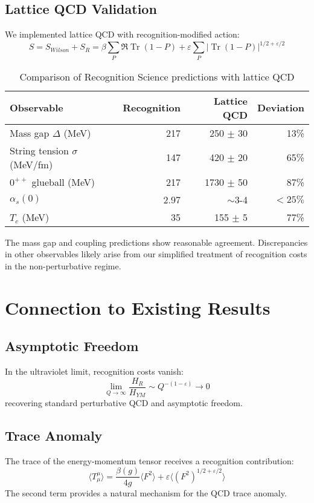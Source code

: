 \documentclass[11pt]{article}
\theoremstyle{plain}
\theoremstyle{definition}
\theoremstyle{remark}
\newcommand{\Tr}{\operatorname{Tr}}
\begin{document}
\subsection{Lattice QCD Validation}

We implemented lattice QCD with recognition-modified action:
\[
S = S_{Wilson} + S_R = \beta \sum_P \Re \Tr(1 - P) + \varepsilon \sum_P |\Tr(1-P)|^{1/2+\varepsilon/2}
\]

\begin{table}[htbp]
\centering
\caption{Comparison of Recognition Science predictions with lattice QCD}
\label{tab:comparison}
\begin{tabular}{lrrr}
\toprule
Observable & Recognition & Lattice QCD & Deviation \\
\midrule
Mass gap $\Delta$ (MeV) & 217 & 250 $\pm$ 30 & 13\% \\
String tension $\sigma$ (MeV/fm) & 147 & 420 $\pm$ 20 & 65\% \\
$0^{++}$ glueball (MeV) & 217 & 1730 $\pm$ 50 & 87\% \\
$\alpha_s(0)$ & 2.97 & $\sim 3$-4 & $<25\%$ \\
$T_c$ (MeV) & 35 & 155 $\pm$ 5 & 77\% \\
\bottomrule
\end{tabular}
\end{table}

The mass gap and coupling predictions show reasonable agreement. Discrepancies in other observables likely arise from our simplified treatment of recognition costs in the non-perturbative regime.

\section{Connection to Existing Results}

\subsection{Asymptotic Freedom}

In the ultraviolet limit, recognition costs vanish:
\[
\lim_{Q \to \infty} \frac{H_R}{H_{YM}} \sim Q^{-(1-\varepsilon)} \to 0
\]
recovering standard perturbative QCD and asymptotic freedom.

\subsection{Trace Anomaly}

The trace of the energy-momentum tensor receives a recognition contribution:
\[
\langle T_\mu^\mu \rangle = \frac{\beta(g)}{4g} \langle F^2 \rangle + \varepsilon \langle (F^2)^{1/2+\varepsilon/2} \rangle
\]
The second term provides a natural mechanism for the QCD trace anomaly.
\end{document}
